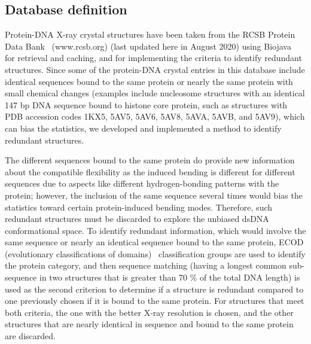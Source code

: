 \subsection{Database definition}\label{Database}
Protein-DNA X-ray crystal structures have been taken from the RCSB Protein Data Bank~\cite{berman2002protein} (www.rcsb.org) (last updated here in August 2020) using Biojava~\cite{biojava,biojava5} for retrieval and caching, and for implementing the criteria to identify redundant structures.
Since some of the protein-DNA crystal entries in this database include identical sequences bound to the same protein or nearly the same protein with small chemical changes (examples include nucleosome structures with an identical 147 bp DNA sequence bound to histone core protein, such as structures with PDB accession codes 1KX5, 5AV5, 5AV6, 5AV8, 5AVA, 5AVB, and 5AV9), which can bias the statistics, we developed and implemented a method to identify redundant structures. 


The different sequences bound to the same protein do provide new information about the compatible flexibility as the induced bending is different for different sequences due to aspects like different hydrogen-bonding patterns with the protein; however, the inclusion of the same sequence several times would bias the statistics toward certain protein-induced bending modes. 
Therefore, such redundant structures must be discarded to explore the unbiased dsDNA conformational space.
To identify redundant information, which would involve the same sequence or nearly an identical sequence bound to the same protein, ECOD (evolutionary classifications of domains)~\cite{ecod} classification groups are used to identify the protein category, and then sequence matching (having a longest common sub-sequence in two structures that is greater than 70 \% of the total DNA length) is used as the second criterion to determine if a structure is redundant compared to one previously chosen if it is bound to the same protein. For structures that meet both criteria, the one with the better X-ray resolution is chosen, and the other structures that are nearly identical in sequence and bound to the same protein are discarded.


